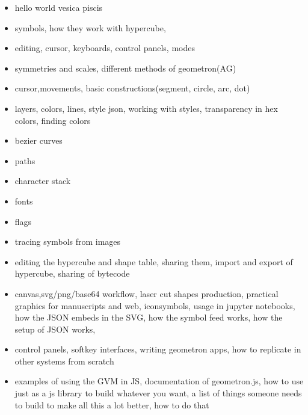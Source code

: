 \begin{itemize}
\tightlist
\item
hello world vesica piscis
\item
symbols, how they work with hypercube, 
\item
editing, cursor, keyboards, control panels, modes
\item
symmetries and scales, different methods of geometron(AG)
\item
cursor,movements, basic constructions(segment, circle, arc, dot)
\item
layers, colors, lines, style json, working with styles, transparency in hex colors, finding colors
\item
bezier curves
\item
paths
\item
character stack
\item
fonts
\item
flags
\item
tracing symbols from images
\item
editing the hypercube and shape table, sharing them, import and export of hypercube, sharing of bytecode
\item
canvas,svg/png/base64 workflow, laser cut shapes production, practical graphics for manuscripts and web, iconsymbols, usage in jupyter notebooks, how the JSON embeds in the SVG, how the symbol feed works, how the setup of JSON works,
\item
control panels, softkey interfaces, writing geometron apps, how to replicate in other systems from scratch
\item
examples of using the GVM in JS, documentation of geometron.js, how to use just as a js library to build whatever you want, a list of things someone needs to build to make all this a lot better, how to do that
\end{itemize}